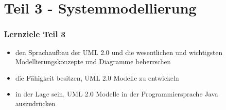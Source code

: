 \part{Teil 3 - Systemmodellierung}

\newpage
\section*{Lernziele Teil 3}

\begin{itemize}
    \item den Sprachaufbau der UML 2.0 und die wesentlichen und wichtigsten Modellierungskonzepte und Diagramme beherrschen
    \item die Fähigkeit besitzen, UML 2.0 Modelle zu entwickeln
    \item in der Lage sein, UML 2.0 Modelle in der Programmiersprache Java auszudrücken
\end{itemize}

\newpage